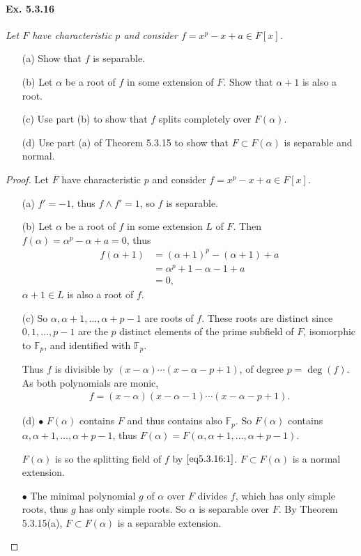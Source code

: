 \documentclass[11pt,a4paper]{article}
\newcommand{\F}{\mathbb{F}}
\begin{document}
\paragraph{Ex. 5.3.16}

{\it Let $F$ have characteristic $p$ and consider $f = x^p-x+a \in F[x]$.
\begin{enumerate}
\item[(a)] Show that $f$ is separable.
\item[(b)] Let $\alpha$ be a root of $f$ in some extension of $F$. Show that $\alpha +1$ is also a root.
\item[(c)] Use part (b) to show that $f$ splits completely over $F(\alpha)$.
\item[(d)] Use part (a) of Theorem 5.3.15 to show that $F \subset F(\alpha)$ is separable and normal.
\end{enumerate}
}

\begin{proof}
Let $F$ have characteristic $p$ and consider $f = x^p-x+a \in F[x]$.
\begin{enumerate}
\item[(a)]
$f' = -1$, thus $f\wedge f'=1$, so $f$ is separable.


\item[(b)]
Let $\alpha$  be a root of $f$ in some extension $L$ of $F$. Then $f(\alpha) = \alpha^p - \alpha+a =0$, thus
\begin{align*}
f(\alpha+1) &= (\alpha+1)^p - (\alpha+1) +a\\
&= \alpha^p+ 1 -\alpha - 1 +a\\
&=0,
\end{align*}
$\alpha+1 \in L$ is also a root of $f$.


\item[(c)] So $\alpha, \alpha+1,\ldots,\alpha+p-1$ are roots of $f$. These roots are distinct since  $0,1,\ldots,p-1$ are the $p$ distinct elements of the prime subfield of  $F$, isomorphic to $\F_p$, and identified with $\F_p$.

 Thus $f$ is divisible by $(x-\alpha)\cdots(x-\alpha- p+1)$, of degree $p = \deg(f)$. As both polynomials are monic,
\begin{align}
f = (x-\alpha)(x-\alpha-1)\cdots(x-\alpha- p+1). \label{eq5.3.16:1}
\end{align}


\item[(d)]
$\bullet$ $F(\alpha)$ contains $F$ and thus contains also $\F_p$. So $ F(\alpha)$ contains $\alpha, \alpha+1, \ldots, \alpha+p-1$, thus $F(\alpha) = F(\alpha, \alpha+1, \ldots, \alpha+p-1)$. 

$F(\alpha)$ is so the splitting field of $f$ by $\eqref{eq5.3.16:1}$. $F \subset F(\alpha)$ is a normal extension.

$\bullet$ The minimal polynomial $g$ of $\alpha$ over $F$ divides $f$, which has only simple roots, thus $g$ has only simple roots. So $\alpha$ is separable over $F$. By Theorem 5.3.15(a), $F \subset F(\alpha)$ is a separable extension.
\end{enumerate}
\end{proof}
\end{document}
